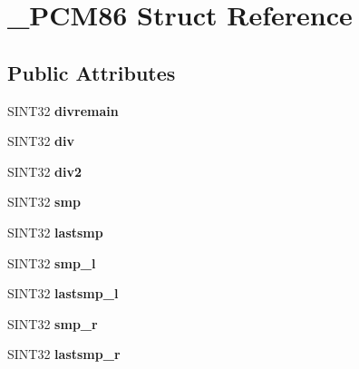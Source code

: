 \hypertarget{struct__PCM86}{\section{\-\_\-\-P\-C\-M86 Struct Reference}
\label{struct__PCM86}
}
\subsection*{Public Attributes}
\begin{DoxyCompactItemize}
\item 
\hypertarget{struct__PCM86_ae0685bb8018bef996cc3ccf82bf3d86f}{S\-I\-N\-T32 {\bfseries divremain}}\label{struct__PCM86_ae0685bb8018bef996cc3ccf82bf3d86f}

\item 
\hypertarget{struct__PCM86_a7887b6970692862202c57c8dc62eb766}{S\-I\-N\-T32 {\bfseries div}}\label{struct__PCM86_a7887b6970692862202c57c8dc62eb766}

\item 
\hypertarget{struct__PCM86_a4c3ca77071861f6d53e43f2b48427cba}{S\-I\-N\-T32 {\bfseries div2}}\label{struct__PCM86_a4c3ca77071861f6d53e43f2b48427cba}

\item 
\hypertarget{struct__PCM86_abd633af0d6033bdef5186f9ca68afc52}{S\-I\-N\-T32 {\bfseries smp}}\label{struct__PCM86_abd633af0d6033bdef5186f9ca68afc52}

\item 
\hypertarget{struct__PCM86_a7915b4591dc21da4d612919f5f8f854c}{S\-I\-N\-T32 {\bfseries lastsmp}}\label{struct__PCM86_a7915b4591dc21da4d612919f5f8f854c}

\item 
\hypertarget{struct__PCM86_a8401927d6651b7f6d226790dcb18886f}{S\-I\-N\-T32 {\bfseries smp\-\_\-l}}\label{struct__PCM86_a8401927d6651b7f6d226790dcb18886f}

\item 
\hypertarget{struct__PCM86_a8fc7e6d9047d8230d3245dda15660934}{S\-I\-N\-T32 {\bfseries lastsmp\-\_\-l}}\label{struct__PCM86_a8fc7e6d9047d8230d3245dda15660934}

\item 
\hypertarget{struct__PCM86_a8588cf566a7d614ef94fd403dc10e4b5}{S\-I\-N\-T32 {\bfseries smp\-\_\-r}}\label{struct__PCM86_a8588cf566a7d614ef94fd403dc10e4b5}

\item 
\hypertarget{struct__PCM86_a693e88c04ad9d7a6fbcf1d3aaee7c692}{S\-I\-N\-T32 {\bfseries lastsmp\-\_\-r}}\label{struct__PCM86_a693e88c04ad9d7a6fbcf1d3aaee7c692}


\end{DoxyCompactItemize}
